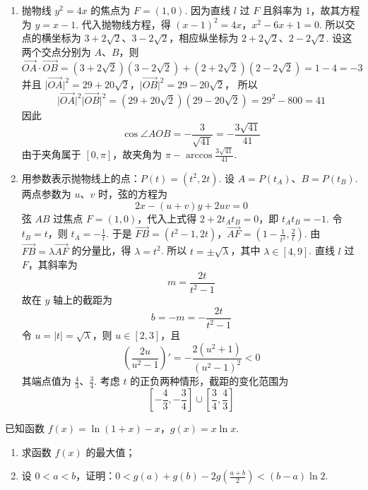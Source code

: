 \begin{solution}
\begin{enumerate}
\item 抛物线 \(y^2=4x\) 的焦点为 \(F=(1,0)\). 因为直线 \(l\) 过 \(F\) 且斜率为 \(1\)，故其方程为 \(y=x-1\). 代入抛物线方程，得
\((x-1)^2=4x\)，\(x^2-6x+1=0\).
所以交点的横坐标为 \(3+2\sqrt2\)、\(3-2\sqrt2\)，相应纵坐标为 \(2+2\sqrt2\)、\(2-2\sqrt2\). 设这两个交点分别为 \(A\)、\(B\)，则
\[
\overrightarrow{OA}\cdot\overrightarrow{OB}
=(3+2\sqrt2)(3-2\sqrt2)+(2+2\sqrt2)(2-2\sqrt2)=1-4=-3
\]
并且
\(\lvert\overrightarrow{OA}\rvert^2=29+20\sqrt2\)，\(\lvert\overrightarrow{OB}\rvert^2=29-20\sqrt2\)，
所以
\[
\lvert\overrightarrow{OA}\rvert^2\lvert\overrightarrow{OB}\rvert^2
=(29+20\sqrt2)(29-20\sqrt2)=29^2-800=41
\]
因此
\[
\cos\angle AOB=-\frac3{\sqrt{41}}=-\frac{3\sqrt{41}}{41}
\]
由于夹角属于 \([0,\pi]\)，故夹角为 \(\displaystyle\pi-\arccos\frac{3\sqrt{41}}{41}\).

\item 用参数表示抛物线上的点：\(P(t)=(t^2,2t)\). 设 \(A=P(t_A)\)、\(B=P(t_B)\). 两点参数为 \(u\)、\(v\) 时，弦的方程为
\[
2x-(u+v)y+2uv=0
\]
弦 \(AB\) 过焦点 \(F=(1,0)\)，代入上式得 \(2+2t_A t_B=0\)，即 \(t_A t_B=-1\). 令 \(t_B=t\)，则 \(t_A=-\frac1t\). 于是
\(\overrightarrow{FB}=(t^2-1,2t)\)，\(\overrightarrow{AF}=\left(1-\frac1{t^2},\frac2t\right)\).
由 \(\overrightarrow{FB}=\lambda\overrightarrow{AF}\) 的分量比，得 \(\lambda=t^2\). 所以 \(t=\pm\sqrt\lambda\)，其中 \(\lambda\in[4,9]\).
直线 \(l\) 过 \(F\)，其斜率为
\[
m=\frac{2t}{t^2-1}
\]
故在 \(y\) 轴上的截距为
\[
b=-m=-\frac{2t}{t^2-1}
\]
令 \(u=\lvert t\rvert=\sqrt\lambda\)，则 \(u\in[2,3]\)，且
\[
\left(\frac{2u}{u^2-1}\right)'=-\frac{2(u^2+1)}{(u^2-1)^2}<0
\]
其端点值为 \(\frac43\)、\(\frac34\). 考虑 \(t\) 的正负两种情形，截距的变化范围为
\[
\left[-\frac43,-\frac34\right]\cup\left[\frac34,\frac43\right]
\]
\end{enumerate}
\end{solution}

\begin{problem}
已知函数 \(f(x) = \ln(1 + x) - x\)，\(g(x) = x \ln x\).

\begin{enumerate}
\item 求函数 \(f(x)\) 的最大值；
\item 设 \(0 < a < b\)，证明：\(0 < g(a) + g(b) - 2g\left(\frac{a + b}{2}\right) < (b - a)\ln 2\).
\end{enumerate}
\end{problem}

